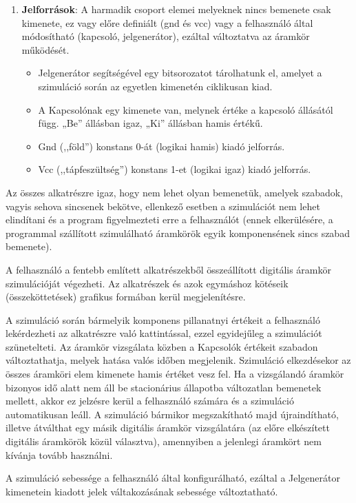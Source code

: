 \begin{enumerate}
\item \textbf{Jelforrások}: A harmadik csoport elemei melyeknek nincs bemenete csak kimenete, ez vagy előre defini\-ált (gnd és vcc) vagy a felhasználó által módosítható (kapcsoló, jelgenerátor), ezáltal változtatva az áramkör működését.
\begin{itemize}
\setlength{\itemsep}{0cm}%
\setlength{\parskip}{0cm}%
\item Jelgenerátor segítségével egy bitsorozatot tárolhatunk el, amelyet a szimuláció során az egyetlen kimenetén ciklikusan kiad.
\item A Kapcsolónak egy kimenete van, melynek értéke a kapcsoló állásától függ. „Be” állásban igaz, „Ki” állásban hamis értékű.
\item Gnd (,,föld'') konstans 0-át (logikai hamis) kiadó jelforrás.
\item Vcc (,,tápfeszültség'') konstans 1-et (logikai igaz) kiadó jelforrás.
\end{itemize}
\end{enumerate}

Az összes alkatrészre igaz, hogy nem lehet olyan bemenetük, amelyek szabadok, vagyis sehova sincsenek bekötve, ellenkező esetben a szimulációt nem lehet elindítani és a program figyelmezteti erre a felhasználót (ennek elkerülésére, a programmal szállított szimulálható áramkörök egyik komponensének sincs szabad bemenete).

A felhasználó a fentebb említett alkatrészekből összeállított digitális áramkör szimulációját végezheti. Az alkatrészek és azok egymáshoz kötéseik (összeköttetések) grafikus formában kerül megjelenítésre.

A szimuláció során bármelyik komponens pillanatnyi értékeit a felhasználó lekérdezheti az alkatrészre való kattintással, ezzel egyidejűleg a szimulációt szünetelteti. Az áramkör vizsgálata közben a Kapcsolók értékeit szabadon változtathatja, melyek hatása valós időben megjelenik. Szimuláció elkezdésekor az összes áramköri elem kimenete hamis értéket vesz fel. Ha a vizsgálandó áramkör bizonyos idő alatt nem áll be stacionárius állapotba változatlan bemenetek mellett, akkor ez jelzésre kerül a felhasználó számára és a szimuláció automatikusan leáll. A szimuláció bármikor megszakítható majd újraindítható, illetve átválthat egy másik di\-gitális áramkör vizsgálatára (az előre elkészített digitális áramkörök közül választva), amennyiben a jelenlegi áramkört nem kívánja tovább használni.

A szimuláció sebessége a felhasználó által konfigurálható, ezáltal a Jelgenerátor kimenetein kiadott jelek váltakozásának sebessége változtatható.

